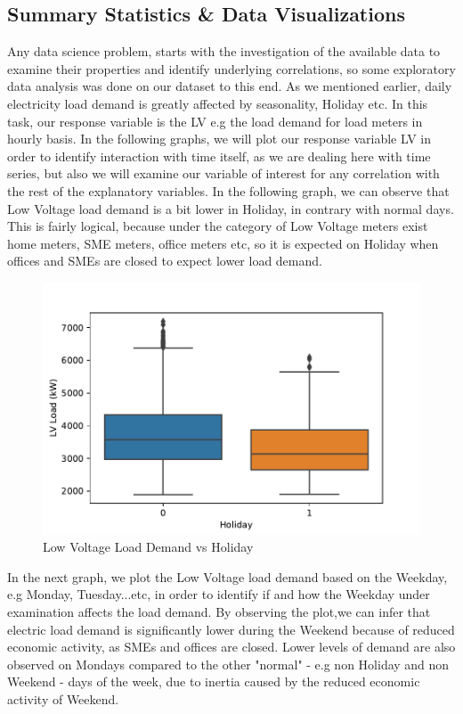 \subsection{Summary Statistics \& Data Visualizations}
Any data science problem, starts with the investigation of the available data to examine their properties and identify underlying correlations, so some exploratory data analysis was done on our dataset to this end. As we mentioned earlier, daily electricity load demand is greatly affected by seasonality, Holiday etc. In this task, our response variable is the LV e.g the load demand for load meters in hourly basis. In the following graphs, we will plot our response variable LV in order to identify interaction with time itself, as we are dealing here with time series, but also we will examine our variable of interest for any correlation with the rest of the explanatory variables. In the following graph, we can observe that Low Voltage load demand is a bit lower in Holiday, in contrary with normal days. This is fairly logical, because under the category of Low Voltage meters exist home meters, SME meters, office meters etc, so it is expected on Holiday when offices and SMEs are closed to expect lower load demand.
\begin{figure}[ht!]
\centering
\includegraphics[width=0.75\linewidth]{project/eda1.pdf}

\caption{Low Voltage Load Demand vs Holiday}
\end{figure}
\par In the next graph, we plot the Low Voltage load demand based on the Weekday, e.g Monday, Tuesday...etc, in order to identify if and how the Weekday under examination affects the load demand. By observing the plot,we can infer that electric load demand is significantly lower during the Weekend because of reduced economic activity, as SMEs and offices are closed. Lower levels of demand are also observed on Mondays compared to the other "normal" - e.g non Holiday and non Weekend - days of the week, due to inertia caused by the reduced economic activity of Weekend.
